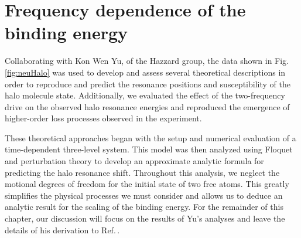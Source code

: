 %	
%
%	
%
%
%
%
%
%
%
%
%
%
%
%	
	
	
\section{Frequency dependence of the binding energy} \label{sec:highE_theory}		
Collaborating with Kon Wen Yu, of the Hazzard group, the data shown in Fig.\,\ref{fig:neuHalo} was used to develop and assess several theoretical descriptions in order to reproduce and predict the resonance positions and susceptibility of the halo molecule state.
Additionally, we evaluated the effect of the two-frequency drive on the observed halo resonance energies and reproduced the emergence of higher-order loss processes observed in the experiment.

These theoretical approaches began with the setup and numerical evaluation of a time-dependent three-level system.
This model was then analyzed using Floquet and perturbation theory to develop an approximate analytic formula for predicting the halo resonance shift.
Throughout this analysis, we neglect the motional degrees of freedom for the initial state of two free atoms.
This greatly simplifies the physical processes we must consider and allows us to deduce an analytic result for the scaling of the binding energy.
For the remainder of this chapter, our discussion will focus on the results of Yu's analyses and leave the details of his derivation to Ref.\,\cite{Kon2018}.

